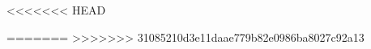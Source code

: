 
\newcommand{\folder}{}

<<<<<<< HEAD
\makeatletter
\newcommand*{\getlength}[1]{\strip@pt#1}
\makeatother

\newlength{\signlength}
\setlength{\signlength}{0.5\textwidth}

\newcommand{\signature}[1]{%
	\noindent \line(1,0){\getlength{\signlength}}\\
	\noindent #1
}

\OnehalfSpacing*
=======
\OnehalfSpacing*
>>>>>>> 31085210d3e11daae779b82e0986ba8027c92a13
